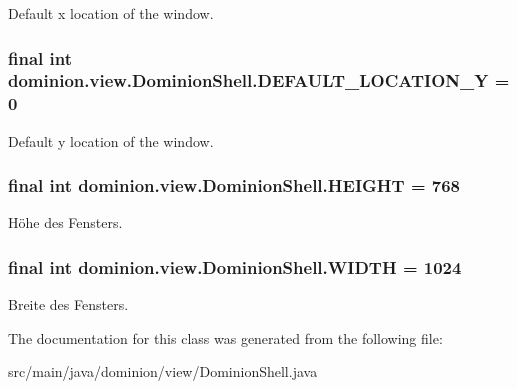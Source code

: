 \-Default x location of the window. \hypertarget{classdominion_1_1view_1_1DominionShell_a5be8882143216217dc71c9bc628273db}{
\subsubsection[{\-D\-E\-F\-A\-U\-L\-T\-\_\-\-L\-O\-C\-A\-T\-I\-O\-N\-\_\-\-Y}]{\setlength{\rightskip}{0pt plus 5cm}final int {\bf dominion.\-view.\-Dominion\-Shell.\-D\-E\-F\-A\-U\-L\-T\-\_\-\-L\-O\-C\-A\-T\-I\-O\-N\-\_\-\-Y} = 0}}\label{classdominion_1_1view_1_1DominionShell_a5be8882143216217dc71c9bc628273db}
\-Default y location of the window. \hypertarget{classdominion_1_1view_1_1DominionShell_aa7fc5dec92276999412d374265b8c5da}{
\subsubsection[{\-H\-E\-I\-G\-H\-T}]{\setlength{\rightskip}{0pt plus 5cm}final int {\bf dominion.\-view.\-Dominion\-Shell.\-H\-E\-I\-G\-H\-T} = 768}}\label{classdominion_1_1view_1_1DominionShell_aa7fc5dec92276999412d374265b8c5da}
\-Höhe des \-Fensters. \hypertarget{classdominion_1_1view_1_1DominionShell_af01ff50efba50286c6685b8848bed064}{
\subsubsection[{\-W\-I\-D\-T\-H}]{\setlength{\rightskip}{0pt plus 5cm}final int {\bf dominion.\-view.\-Dominion\-Shell.\-W\-I\-D\-T\-H} = 1024}}\label{classdominion_1_1view_1_1DominionShell_af01ff50efba50286c6685b8848bed064}
\-Breite des \-Fensters. 

\-The documentation for this class was generated from the following file\-:\begin{DoxyCompactItemize}
\item 
src/main/java/dominion/view/\-Dominion\-Shell.\-java\end{DoxyCompactItemize}
